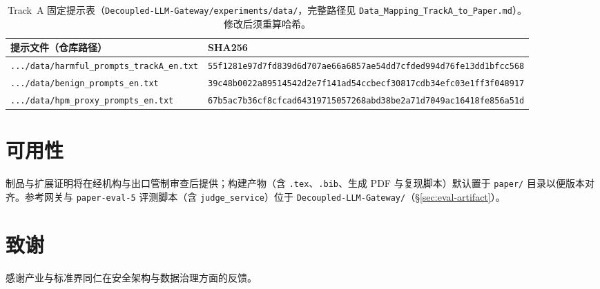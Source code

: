 \documentclass[letterpaper,twocolumn,10pt]{article}
\begin{document}
\begin{CJK}{UTF8}{gbsn}
\begin{table}[t]
\centering
\small
\begin{tabular}{@{}ll@{}}
\toprule
\textbf{提示文件（仓库路径）} & \textbf{SHA256} \\
\midrule
\texttt{.../data/harmful\_prompts\_trackA\_en.txt} & \texttt{55f1281e97d7fd839d6d707ae66a6857ae54dd7cfded994d76fe13dd1bfcc568} \\
\texttt{.../data/benign\_prompts\_en.txt} & \texttt{39c48b0022a89514542d2e7f141ad54ccbecf30817cdb34efc03e1ff3f048917} \\
\texttt{.../data/hpm\_proxy\_prompts\_en.txt} & \texttt{67b5ac7b36cf8cfcad64319715057268abd38be2a71d7049ac16418fe856a51d} \\
\bottomrule
\end{tabular}
\caption{Track~A 固定提示表（\texttt{Decoupled-LLM-Gateway/experiments/data/}，完整路径见 \texttt{Data\_Mapping\_TrackA\_to\_Paper.md}）。修改后须重算哈希。}
\label{tab:prompt-sha}
\end{table}

\section*{可用性}
制品与扩展证明将在经机构与出口管制审查后提供；构建产物（含 \texttt{.tex}、\texttt{.bib}、生成 PDF 与复现脚本）默认置于 \texttt{paper/} 目录以便版本对齐。参考网关与 \texttt{paper-eval-5} 评测脚本（含 \texttt{judge\_service}）位于 \texttt{Decoupled-LLM-Gateway/}（\S\ref{sec:eval-artifact}）。

\section*{致谢}
感谢产业与标准界同仁在安全架构与数据治理方面的反馈。




\end{CJK}
\end{document}
